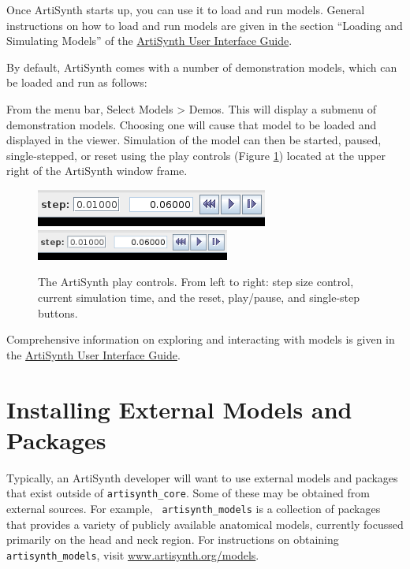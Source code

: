 Once ArtiSynth starts up, you can use it to load and run
models. General instructions on how to load and run models are given
in the section ``Loading and Simulating Models'' of the
\href{\artisynthDocBase/html/uiguide/uiguide.html}%
{ArtiSynth User Interface Guide}. 

By default, ArtiSynth comes with a number of demonstration models,
which can be loaded and run as follows:

From the menu bar, Select {\sf Models > Demos}.  This will display a
submenu of demonstration models. Choosing one will cause that model to
be loaded and displayed in the viewer.  Simulation of the model can
then be started, paused, single-stepped, or reset using the play
controls (Figure \ref{PlayControlsFig}) located at the upper right of
the ArtiSynth window frame.

\begin{figure}
\begin{center}
\iflatexml
\includegraphics[]{images/playControls}
\else
\includegraphics[width=2.5in]{images/playControls}
\fi
\end{center}
\caption{The ArtiSynth play controls. From left to right: step size
control, current simulation time, and the reset, play/pause, and
single-step buttons.}%
\label{PlayControlsFig}
\end{figure}

Comprehensive information on exploring and interacting with models is
given in the
\href{\artisynthDocBase/html/uiguide/uiguide.html}%
{ArtiSynth User Interface Guide}.

\section{Installing External Models and Packages}
\label{AdditionalModelsAndPackages}

Typically, an ArtiSynth developer will want to use external models and
packages that exist outside of {\tt artisynth\_core}.  Some of these
may be obtained from external sources.  For example, {\tt
artisynth\_models} is a collection of packages that provides a variety
of publicly available anatomical models, currently focussed primarily
on the head and neck region. For instructions on obtaining {\tt
artisynth\_models}, visit 
\href{https://www.artisynth.org/models}{www.artisynth.org/models}.

